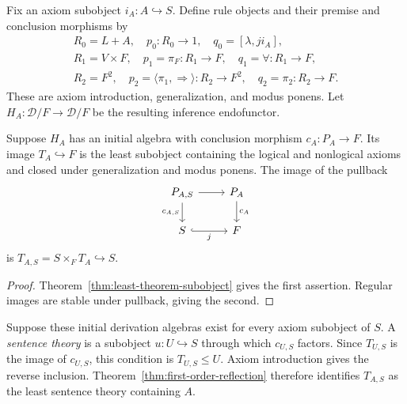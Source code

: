 Fix an axiom subobject $i_A:A\hookrightarrow S$. Define rule objects
and their premise and conclusion morphisms by
\begin{gather*}
 R_0=L+A,\quad p_0:R_0\to1,\quad q_0=[\lambda,ji_A],\\
 R_1=V\times F,\quad p_1=\pi_F:R_1\to F,
             \quad q_1=\forall:R_1\to F,\\
 R_2=F^2,\quad p_2=\langle\pi_1,\Rightarrow\rangle:R_2\to F^2,
             \quad q_2=\pi_2:R_2\to F.
\end{gather*}
These are axiom introduction, generalization, and modus ponens.
Let $H_A:\mathcal D/F\to
\mathcal D/F$ be the resulting inference endofunctor.

\begin{theorem}\label{thm:first-order-theory}
Suppose $H_A$ has an initial algebra with conclusion morphism
$c_A:P_A\to F$. Its image $T_A\hookrightarrow F$ is the least
subobject containing the logical and nonlogical axioms and closed
under generalization and modus ponens. The image of the pullback
\[
\begin{tikzcd}
 P_{A,S}\arrow[r]\arrow[d,"c_{A,S}"'] & P_A\arrow[d,"c_A"]\\
 S\arrow[r,hook,"j"'] & F
\end{tikzcd}
\]
is $T_{A,S}=S\times_F T_A\hookrightarrow S$.
\end{theorem}
\begin{proof}
Theorem~\ref{thm:least-theorem-subobject} gives the first assertion.
Regular images are stable under pullback, giving the second.
\end{proof}

Suppose these initial derivation algebras exist for every axiom
subobject of $S$. A \emph{sentence theory} is a subobject
$u:U\hookrightarrow S$ through which $c_{U,S}$ factors.
Since $T_{U,S}$ is the image of $c_{U,S}$, this condition is
$T_{U,S}\leq U$. Axiom introduction gives the reverse inclusion.
Theorem~\ref{thm:first-order-reflection} therefore identifies $T_{A,S}$
as the least sentence theory containing $A$.


